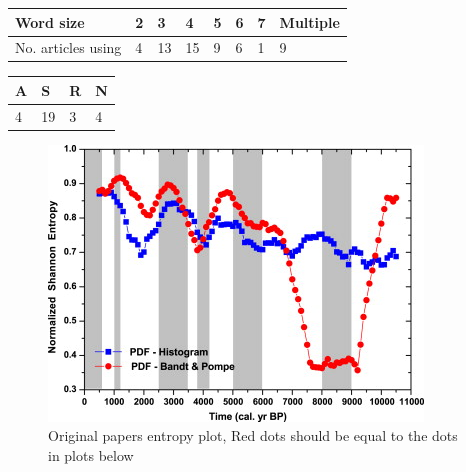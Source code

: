 \begin{table}[]
\begin{tabular}{|l|l|l|l|l|l|l|l|}
\hline
Word size & 2 & 3  & 4  & 5 & 6 & 7 & Multiple \\ \hline
No. articles using  & 4 & 13 & 15 & 9 & 6 & 1 & 9        \\ \hline
\end{tabular}
\end{table}

\begin{table}[]
\begin{tabular}{|l|l|l|l|}
\hline
A & S  & R & N \\ \hline
4 & 19 & 3 & 4 \\ \hline
\end{tabular}
\end{table}

\begin{figure}
    \centering
    \includegraphics[width=\textwidth,keepaspectratio]{ElNino/ArticleEntropyPlot.jpg}
    \caption{Original papers entropy plot, Red dots should be equal to the dots in plots below}
\end{figure}

